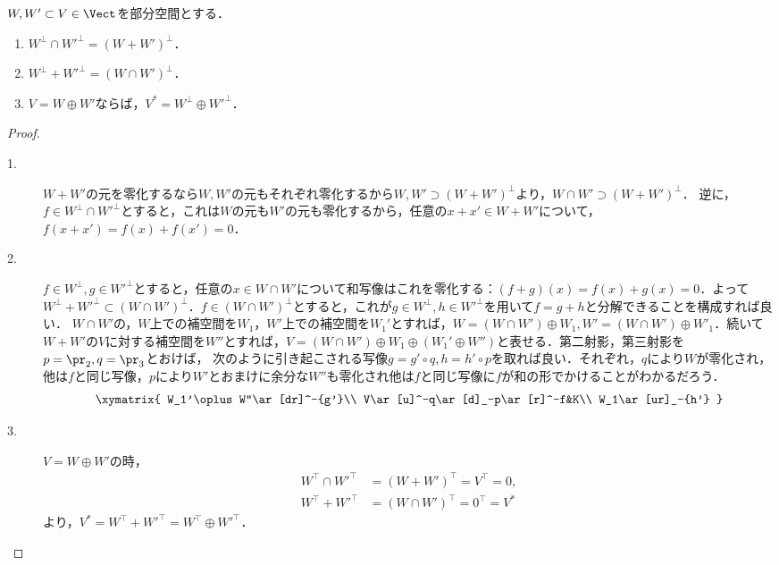 \documentclass[uplatex, dvipdfmx]{jsreport}
\begin{document}
\begin{proposition}[零化空間は直和分解を保存する]\label{prop-annihilator-space-and-direct-sum}
    $W,W'\subset V\in\Vect$を部分空間とする．
    \begin{enumerate}
        \item $W^\bot\cap W'^\bot=(W+W')^\bot$．
        \item $W^\bot+W'^\bot=(W\cap W')^\bot$．
        \item $V=W\oplus W'$ならば，$V^*=W^\bot\oplus W'^\bot$．
    \end{enumerate}
\end{proposition}
\begin{proof}\mbox{}
    \begin{description}
        \item[1.] $W+W'$の元を零化するなら$W,W'$の元もそれぞれ零化するから$W,W'\supset(W+W')^\bot$より，$W\cap W'\supset(W+W')^\bot$．
        逆に，$f\in W^\bot\cap W'^\bot$とすると，これは$W$の元も$W'$の元も零化するから，任意の$x+x'\in W+W'$について，$f(x+x')=f(x)+f(x')=0$．
        \item[2.] $f\in W^\bot,g\in W'^\bot$とすると，任意の$x\in W\cap W'$について和写像はこれを零化する：$(f+g)(x)=f(x)+g(x)=0$．よって$W^\bot+W'^\bot\subset(W\cap W')^\bot$．$f\in(W\cap W')^\bot$とすると，これが$g\in W^\bot,h\in W'^\bot$を用いて$f=g+h$と分解できることを構成すれば良い．
        $W\cap W'$の，$W$上での補空間を$W_1$，$W'$上での補空間を$W_1'$とすれば，$W=(W\cap W')\oplus W_1, W'=(W\cap W')\oplus W'_1$．続いて$W+W'$の$V$に対する補空間を$W''$とすれば，$V=(W\cap W')\oplus W_1\oplus (W_1'\oplus W'')$と表せる．第二射影，第三射影を$p=\pr_2,q=\pr_3$とおけば，
        次のように引き起こされる写像$g=g'\circ q,h=h'\circ p$を取れば良い．それぞれ，$q$により$W$が零化され，他は$f$と同じ写像，$p$により$W'$とおまけに余分な$W''$も零化され他は$f$と同じ写像に$f$が和の形でかけることがわかるだろう．
        \[\xymatrix{
            W_1'\oplus W''\ar[dr]^-{g'}\\
            V\ar[u]^-q\ar[d]_-p\ar[r]^-f&K\\
            W_1\ar[ur]_-{h'}
        }\]
        \item[3.] $V=W\oplus W'$の時，\begin{align*}
            W^\top\cap W'^\top&=(W+W')^\top=V^\top=0,\\
            W^\top+W'^\top&=(W\cap W')^\top=0^\top=V^*
        \end{align*}
        より，$V^*=W^\top+W'^\top=W^\top\oplus W'^\top$．
    \end{description}
\end{proof}
\end{document}
